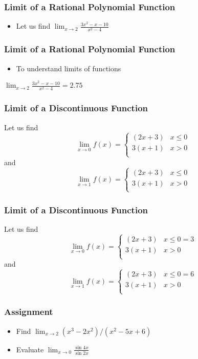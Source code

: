 \documentclass[17pt]{beamer}
\begin{document}
\sffamily \bfseries

\begin{frame}
\frametitle{Limit of a Rational Polynomial Function}\pause
\begin{itemize}
\item Let us find $\lim_{x \to 2} \frac {3x^{2}-x-10} {x^{2}-4}$
\end{itemize}
\end{frame}

\begin{frame}
\frametitle{Limit of a Rational Polynomial Function}\pause
\begin{itemize}
\item To understand limits of functions
\end{itemize}
$\lim_{x \to 2} \frac {3x^{2}-x-10} {x^{2}-4} = 2.75$
\end{frame}

\begin{frame}
\frametitle{Limit of a Discontinuous Function}\pause
Let us find \[\lim_{x \to 0} f(x) = \left\{
\begin{array}{ll}
          (2x+3) & x \leq 0 \\
          3(x+1) & x > 0 \\
          \end{array}
          \right. \]
and \[\lim_{x \to 1} f(x) = \left\{
\begin{array}{ll}
          (2x+3) & x \leq 0 \\
          3(x+1) & x > 0 \\
          \end{array}
          \right. \]
\end{frame}

\begin{frame}
\frametitle{Limit of a Discontinuous Function}\pause
Let us find \[\lim_{x \to 0} f(x) = \left\{
\begin{array}{ll}
          (2x+3) & x \leq 0 = 3 \\
          3(x+1) & x > 0 \\
          \end{array}
          \right. \]
and \[\lim_{x \to 1} f(x) = \left\{
\begin{array}{ll}
          (2x+3) & x \leq 0 = 6 \\
          3(x+1) & x > 0 \\
          \end{array}
          \right. \]
\end{frame}

\begin{frame}
\frametitle{Assignment}\pause
\begin{itemize} [<+-|alert@+>] 
\item Find $\lim_{x \to 2} (x^{3}-2x^{2})/(x^{2}-5x+6)$
\item Evaluate $\lim_{x \to 0} \frac {\sin 4x} {\sin 2x}$
\end{itemize}
\end{frame}
\end{document}
